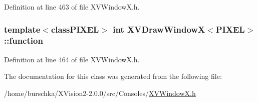 Definition at line 463 of file XVWindow\-X.h.\label{XVDrawWindowX_n1}
\hypertarget{class_XVDrawWindowX_n1}{
\subsubsection[function]{\setlength{\rightskip}{0pt plus 5cm}template$<$classPIXEL$>$ int XVDraw\-Window\-X$<$PIXEL$>$::function}}




Definition at line 464 of file XVWindow\-X.h.

The documentation for this class was generated from the following file:\begin{CompactItemize}
\item 
/home/burschka/XVision2-2.0.0/src/Consoles/\hyperlink{XVWindowX.h-source}{XVWindow\-X.h}\end{CompactItemize}
